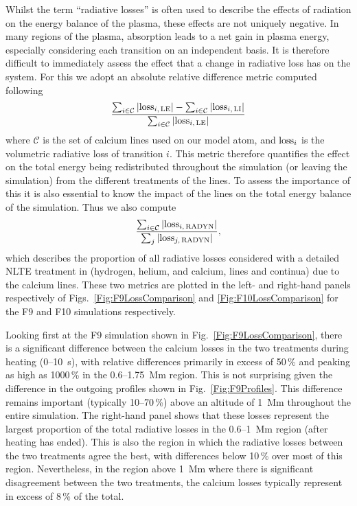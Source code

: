 Whilst the term ``radiative losses'' is often used to describe the effects of radiation on the energy balance of the plasma, these effects are not uniquely negative.
In many regions of the plasma, absorption leads to a net gain in plasma energy, especially considering each transition on an independent basis.
It is therefore difficult to immediately assess the effect that a change in radiative loss has on the system.
For this we adopt an absolute relative difference metric computed following
\begin{equation}
    \frac{\sum_{i\in\mathcal{C}}|\textnormal{loss}_{i,\,\textnormal{LE}}| - \sum_{i\in\mathcal{C}}|\textnormal{loss}_{i,\,\textnormal{LI}}|}{\sum_{i\in\mathcal{C}}|\textnormal{loss}_{i,\,\textnormal{LE}}|}
\end{equation}
where $\mathcal{C}$ is the set of calcium lines used on our model atom, and $\textnormal{loss}_i$ is the volumetric radiative loss of transition $i$.
This metric therefore quantifies the effect on the total energy being redistributed throughout the simulation (or leaving the simulation) from the different treatments of the \Caii{} lines.
To assess the importance of this it is also essential to know the impact of the \Caii{} lines on the total energy balance of the simulation.
Thus we also compute
\begin{equation}
    \frac{\sum_{i\in\mathcal{C}}|\textnormal{loss}_{i,\,\textnormal{RADYN{}}}|}{\sum_j|\textnormal{loss}_{j,\,\textnormal{RADYN{}}}|},
\end{equation}
which describes the proportion of all radiative losses considered with a detailed NLTE treatment in \Radyn{} (hydrogen, helium, and calcium, lines and continua) due to the calcium lines.
These two metrics are plotted in the left- and right-hand panels respectively of Figs.~\ref{Fig:F9LossComparison} and \ref{Fig:F10LossComparison} for the F9 and F10 simulations respectively.

Looking first at the F9 simulation shown in Fig.~\ref{Fig:F9LossComparison}, there is a significant difference between the calcium losses in the two treatments during heating (0--\SI{10}{\second}), with relative differences primarily in excess of 50\,\% and peaking as high as 1000\,\% in the 0.6--\SI{1.75}{\mega\m} region.
This is not surprising given the difference in the outgoing profiles shown in Fig.~\ref{Fig:F9Profiles}.
This difference remains important (typically 10--70\,\%) above an altitude of \SI{1}{\mega\metre} throughout the entire simulation.
The right-hand panel shows that these losses represent the largest proportion of the total radiative losses in the 0.6--\SI{1}{\mega\metre} region (after heating has ended).
This is also the region in which the radiative losses between the two treatments agree the best, with differences below 10\,\% over most of this region.
Nevertheless, in the region above \SI{1}{\mega\metre} where there is significant disagreement between the two treatments, the calcium losses typically represent in excess of 8\,\% of the total.

